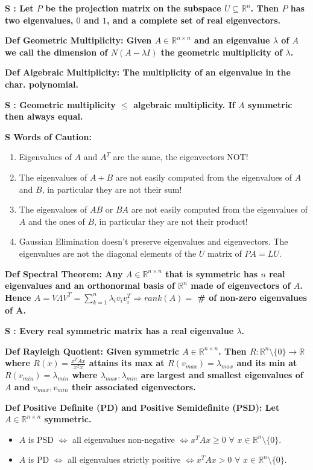 \documentclass[7pt,landscape, margin = 0.1mm]{article}
\newcommand{\DEF}[2]{\color{chaptercolor}\bf{Def #1}:\color{black}    \hspace{0.2cm} #2}
\newcommand{\SA}[2]{\color{chaptercolor}\bf{S #1}:\color{black}    \hspace{0.2cm} #2}
\begin{document}
\begin{multicols}{4}
\begin{flushleft}
{\SA{}{Let $P$ be the projection matrix on the subspace $U\subseteq\mathbb{R}^n$. Then $P$ has two eigenvalues, $0$ and $1$, and a complete set of real eigenvectors.}

\DEF{Geometric Multiplicity}{Given $A\in\mathbb{R}^{n\times n}$ and an eigenvalue $\lambda$ of $A$ we call the dimension of $N(A-\lambda I)$ the geometric multiplicity of $\lambda$.}

\DEF{Algebraic Multiplicity}{The  multiplicity of an eigenvalue in the char. polynomial.}

\SA{}{Geometric multiplicity $\leq $ algebraic multiplicity. If $A$ symmetric then always equal.}

\SA{Words of Caution}{\begin{enumerate}[nolistsep]
    \item Eigenvalues of $A$ and $A^T$ are the same, the eigenvectors NOT!
    \item The eigenvalues of $A+B$ are not easily computed from the eigenvalues of $A$ and $B$, in particular they are not their sum!
    \item The eigenvalues of $AB$ or $BA$ are not easily computed from the eigenvalues of $A$ and the ones of $B$, in particular they are not their product!
    \item Gaussian Elimination doesn't preserve eigenvalues and eigenvectors. The eigenvalues are not the diagonal elements of the $U$ matrix of $PA=LU$.
\end{enumerate}}

\DEF{Spectral Theorem}{Any $A\in\mathbb{R}^{n\times n}$ that is symmetric has $n$ real eigenvalues and an orthonormal basis of $\mathbb{R}^n$ made of eigenvectors of $A$. Hence $A=V\Lambda V^T=\sum_{k=1}^n\lambda_iv_iv_i^T \Rightarrow rank(A)=$ \# of non-zero eigenvalues of A.}

\SA{}{Every real symmetric matrix has a real eigenvalue $\lambda$.}

\DEF{Rayleigh Quotient}{Given symmetric $A\in\mathbb{R}^{n\times n}$. Then $R:\mathbb{R}^n\setminus\{0\}\rightarrow\mathbb{R}$ where $R(x)=\frac{x^TAx}{x^Tx}$ attains its max at $R(v_{max})=\lambda_{max}$ and its min at $R(v_{min})=\lambda_{min}$ where $\lambda_{max},\lambda_{min}$ are largest and smallest eigenvalues of $A$ and $v_{max},v_{min}$ their associated eigenvectors.}

\DEF{Positive Definite (PD) and Positive Semidefinite (PSD)}{Let $A\in\mathbb{R}^{n\times n}$ symmetric. \begin{itemize}
    \item $A$ is PSD $\Leftrightarrow$ all eigenvalues non-negative $\Leftrightarrow x^TAx\geq0$ $\forall$ $x\in\mathbb{R}^n\setminus\{0\}$.
    \item $A$ is PD $\Leftrightarrow$ all eigenvalues strictly positive $\Leftrightarrow x^TAx>0$ $\forall$ $x\in\mathbb{R}^n\setminus\{0\}$. 
\end{itemize}}

}
\end{flushleft}
\end{multicols}
\end{document}
